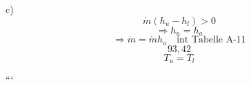 c)
\[
\dot{m} (h_u - h_l) > 0
\]
\[
\Rightarrow h_u = h_a
\]
\[
\Rightarrow \dot{m} = \dot{m} h_a \quad \text{int Tabelle A-11}
\]
\[
93,42
\]
\[
T_u = T_l
\]

```